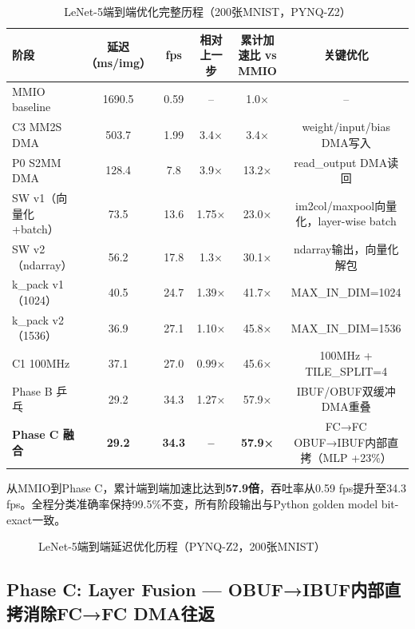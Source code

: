 \documentclass[12pt, a4paper]{article}
\begin{document}
\begin{table}[H]
    \centering
    \caption{LeNet-5端到端优化完整历程（200张MNIST，PYNQ-Z2）}
    \label{tab:optimization_journey}
    \small
    \begin{tabular}{lccccc}
        \toprule
        阶段 & 延迟（ms/img） & fps & 相对上一步 & 累计加速比 vs MMIO & 关键优化 \\
        \midrule
        MMIO baseline & 1690.5 & 0.59 & -- & 1.0× & -- \\
        C3 MM2S DMA & 503.7 & 1.99 & 3.4× & 3.4× & weight/input/bias DMA写入 \\
        P0 S2MM DMA & 128.4 & 7.8 & 3.9× & 13.2× & read\_output DMA读回 \\
        SW v1（向量化+batch） & 73.5 & 13.6 & 1.75× & 23.0× & im2col/maxpool向量化，layer-wise batch \\
        SW v2（ndarray） & 56.2 & 17.8 & 1.3× & 30.1× & ndarray输出，向量化解包 \\
        k\_pack v1（1024） & 40.5 & 24.7 & 1.39× & 41.7× & MAX\_IN\_DIM=1024 \\
        k\_pack v2（1536） & 36.9 & 27.1 & 1.10× & 45.8× & MAX\_IN\_DIM=1536 \\
        C1 100MHz & 37.1 & 27.0 & 0.99× & 45.6× & 100MHz + TILE\_SPLIT=4 \\
        Phase B 乒乓 & 29.2 & 34.3 & 1.27× & 57.9× & IBUF/OBUF双缓冲DMA重叠 \\
        \textbf{Phase C 融合} & \textbf{29.2} & \textbf{34.3} & \textbf{--} & \textbf{57.9×} & FC→FC OBUF→IBUF内部直拷（MLP +23\%） \\
        \bottomrule
    \end{tabular}
\end{table}

从MMIO到Phase C，累计端到端加速比达到\textbf{57.9倍}，吞吐率从0.59 fps提升至34.3 fps。全程分类准确率保持99.5\%不变，所有阶段输出与Python golden model bit-exact一致。

\begin{figure}[H]
    \centering
    \caption{LeNet-5端到端延迟优化历程（PYNQ-Z2，200张MNIST）}
    \label{fig:optimization_journey}
\end{figure}

\subsection{Phase C: Layer Fusion — OBUF→IBUF内部直拷消除FC→FC DMA往返}
\label{sec:phase_c}
\end{document}
